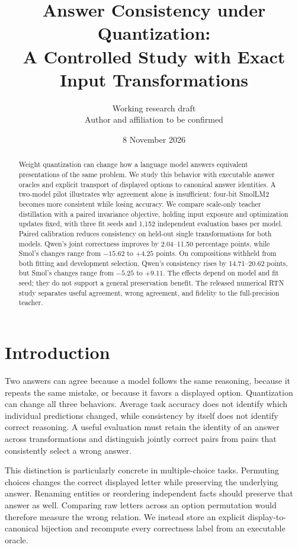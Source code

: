\documentclass[11pt]{article}
\title{Answer Consistency under Quantization:\\
A Controlled Study with Exact Input Transformations}
\author{Working research draft\\Author and affiliation to be confirmed}
\date{8 November 2026}
\begin{document}
\maketitle

\begin{abstract}
Weight quantization can change how a language model answers equivalent
presentations of the same problem. We study this behavior with executable
answer oracles and explicit transport of displayed options to canonical
answer identities. A two-model pilot illustrates why agreement alone is
insufficient: four-bit SmolLM2 becomes more consistent while losing accuracy.
We compare scale-only teacher distillation with a paired invariance objective,
holding input exposure and optimization updates fixed, with three fit seeds
and 1,152 independent evaluation bases per model. Paired calibration reduces
consistency on held-out single transformations for both models. Qwen's joint
correctness improves by 2.04--11.50 percentage points, while Smol's changes
range from $-15.62$ to $+4.25$ points. On compositions withheld from both
fitting and development selection, Qwen's consistency rises by
14.71--20.62 points, but Smol's changes range from $-5.25$ to $+9.11$.
The effects depend on model and fit seed; they do not support a general
preservation benefit. The released numerical RTN study separates useful
agreement, wrong agreement, and fidelity to the full-precision teacher.
\end{abstract}

\section{Introduction}
Two answers can agree because a model follows the same reasoning, because
it repeats the same mistake, or because it favors a displayed option.
Quantization can change all three behaviors. Average task accuracy does not
identify which individual predictions changed, while consistency by itself
does not identify correct reasoning. A useful evaluation must retain the
identity of an answer across transformations and distinguish jointly correct
pairs from pairs that consistently select a wrong answer.

This distinction is particularly concrete in multiple-choice tasks.
Permuting choices changes the correct displayed letter while preserving the
underlying answer. Renaming entities or reordering independent facts should
preserve that answer as well. Comparing raw letters across an option
permutation would therefore measure the wrong relation. We instead store an
explicit display-to-canonical bijection and recompute every correctness
label from an executable oracle.
\end{document}
